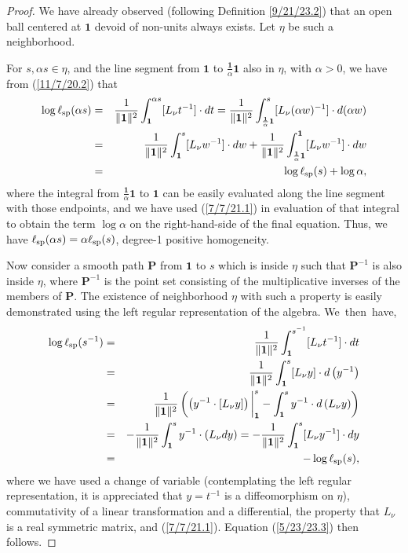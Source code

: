 \documentclass{amsart}
\numberwithin{equation}{section}
\theoremstyle{definition}
\numberwithin{theorem}{section}
\begin{document}
\begin{proof} We have already observed (following Definition \ref{9/21/23.2}) that an open ball centered at $\mathbf{1}$ devoid of non-units always exists.  Let $\eta$  be such a neighborhood.

For $s,\alpha s\in\eta$,  and the line segment from $\mathbf{1}$ to $\frac{\mathbf{1}}{\alpha}\mathbf{1}$ also in  $\eta$, with $\alpha>0$, we have from (\ref{11/7/20.2}) that
\begin{eqnarray}\nonumber  \log\ell_{\rm sp}(\alpha s) &=&  \frac{1}{\|{\bf 1}\|^2}\int_{\bf 1}^{\alpha s} [L_{\nu}t^{-1}]\cdot dt = \frac{1}{\|{\bf 1}\|^2}\int_{\frac{\mathbf{1}}{\alpha}\mathbf{1}}^{s} [L_{\nu}(\alpha w)^{-1}]\cdot d(\alpha w)  \\ \nonumber &=&  \frac{1}{\|{\bf 1}\|^2}\int_{\mathbf{1}}^{s} [L_{\nu}w^{-1}]\cdot dw + \frac{1}{\|{\bf 1}\|^2}\int_{\frac{\mathbf{1}}{\alpha} \mathbf{1}}^{\mathbf{1}} [L_{\nu}w^{-1}]\cdot dw  \\ &=& \log \ell_{\rm sp}(s) + \log\alpha, \label{4/2/23.1}
\end{eqnarray} where the integral from $\frac{\mathbf{1}}{\alpha} \mathbf{1}$ to $\mathbf{1}$ can be easily evaluated along the line segment with those endpoints, and we have used (\ref{7/7/21.1}) in evaluation of that integral to obtain the term $\log \alpha$ on the right-hand-side of the final equation.  Thus, we have $\ell_{\rm sp}(\alpha s) = \alpha\ell_{\rm sp}(s)$, degree-1 positive homogeneity.

Now consider a smooth path $\mathbf{P}$ from $\mathbf{1}$ to $s$ which is inside $\eta$  such that $\mathbf{P}^{-1}$ is also inside $\eta$,  where $\mathbf{P}^{-1}$ is the point set consisting of the multiplicative inverses of the members of $\mathbf{P}$.  The  existence of neighborhood $\eta$ with such a property is  easily demonstrated using the left regular representation of the algebra.
\mbox{We then have,} \begin{eqnarray}  \log \ell_{\rm sp}(s^{-1})   &=&   \frac{1}{\|{\bf 1}\|^2} \int_{\bf 1}^{s^{-1}} [L_{\nu}t^{-1}] \cdot dt \nonumber \\ &=&  \frac{1}{\|{\bf 1}\|^2} \int_{\bf 1}^s [L_{\nu}y]\cdot d\left(y^{-1}\right) \nonumber \\ &=&  \frac{1}{\|{\bf 1}\|^2}\left(\left(y^{-1}\cdot [L_{\nu}y]\right)\bigg|_{\bf 1}^s - \int_{\bf 1}^s y^{-1}\cdot d\left(L_{\nu}y\right)\right)   \nonumber \\ &=& -\frac{1}{\|{\bf 1}\|^2} \int_{\bf 1}^s y^{-1}\cdot (L_{\nu}dy) = -\frac{1}{\|{\bf 1}\|^2} \int_{\bf 1}^s [L_{\nu}y^{-1}] \cdot dy  \nonumber \\ &=& -\log \ell_{\rm sp}(s),\label{4/2/23.5} \end{eqnarray} where we have used a change of variable (contemplating the left regular representation, it is appreciated that $y=t^{-1}$ is a diffeomorphism on $\eta$), commutativity of a linear transformation and a differential, the property that $L_{\nu}$ is a real symmetric matrix, and  (\ref{7/7/21.1}).  Equation (\ref{5/23/23.3}) then follows.
\end{proof}
\end{document}
